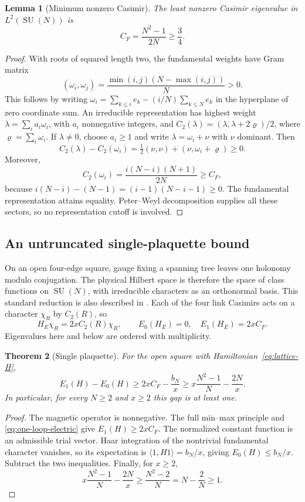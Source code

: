 \documentclass[11pt,letterpaper]{article}
\newcommand{\SU}{\operatorname{SU}}
\newtheorem{theorem}{Theorem}[section]
\newtheorem{lemma}[theorem]{Lemma}
\theoremstyle{definition}
\numberwithin{equation}{section}
\begin{document}
\begin{lemma}[Minimum nonzero Casimir]
The least nonzero Casimir eigenvalue in $L^2(\SU(N))$ is
\begin{equation}
 C_F=\frac{N^2-1}{2N}\ge\frac34.
 \label{eq:casimir-floor}
\end{equation}
\end{lemma}
\begin{proof}
With roots of squared length two, the fundamental weights have Gram matrix
\[
 (\omega_i,\omega_j)=\frac{\min(i,j)(N-\max(i,j))}{N}>0.
\]
This follows by writing
$\omega_i=\sum_{k\le i}e_k-(i/N)\sum_{k\le N}e_k$ in the hyperplane of
zero coordinate sum. An irreducible representation has highest weight
$\lambda=\sum_i a_i\omega_i$, with $a_i$ nonnegative integers, and
$C_2(\lambda)=(\lambda,\lambda+2\varrho)/2$, where
$\varrho=\sum_i\omega_i$. If $\lambda\ne0$, choose $a_i\ge1$ and
write $\lambda=\omega_i+\nu$ with $\nu$ dominant. Then
\[
 C_2(\lambda)-C_2(\omega_i)
 =\tfrac12(\nu,\nu)+(\nu,\omega_i+\varrho)\ge0.
\]
Moreover,
\[
 C_2(\omega_i)=\frac{i(N-i)(N+1)}{2N}\ge C_F,
\]
because $i(N-i)-(N-1)=(i-1)(N-i-1)\ge0$. The fundamental representation
attains equality. Peter--Weyl decomposition supplies all these sectors,
so no representation cutoff is involved.
\end{proof}

\subsection{An untruncated single-plaquette bound}

On an open four-edge square, gauge fixing a spanning tree leaves one
holonomy modulo conjugation. The physical Hilbert space is therefore the
space of class functions on $\SU(N)$, with irreducible characters as an
orthonormal basis. This standard reduction is also described in
\cite{ligterink}. Each of the four link Casimirs acts on a character
$\chi_R$ by $C_2(R)$, so
\begin{equation}
 H_E\chi_R=2xC_2(R)\chi_R,
 \qquad E_0(H_E)=0,\quad E_1(H_E)=2xC_F.
 \label{eq:one-loop-electric}
\end{equation}
Eigenvalues here and below are ordered with multiplicity.

\begin{theorem}[Single plaquette]
For the open square with Hamiltonian~\eqref{eq:lattice-H},
\begin{equation}
 E_1(H)-E_0(H)\ge2xC_F-\frac{b_N}{x}
 \ge x\frac{N^2-1}{N}-\frac{2N}{x}.
 \label{eq:one-plaquette-bound}
\end{equation}
In particular, for every $N\ge2$ and $x\ge2$ this gap is at least one.
\end{theorem}
\begin{proof}
The magnetic operator is nonnegative. The full min--max principle and
\eqref{eq:one-loop-electric} give $E_1(H)\ge2xC_F$. The normalized
constant function is an admissible trial vector. Haar integration of the
nontrivial fundamental character vanishes, so its expectation is
$\langle1,H1\rangle=b_N/x$, giving $E_0(H)\le b_N/x$. Subtract the two
inequalities. Finally, for $x\ge2$,
\[
 x\frac{N^2-1}{N}-\frac{2N}{x}
 \ge\frac{N^2-2}{N}=N-\frac2N\ge1.
\]
\end{proof}
\end{document}
